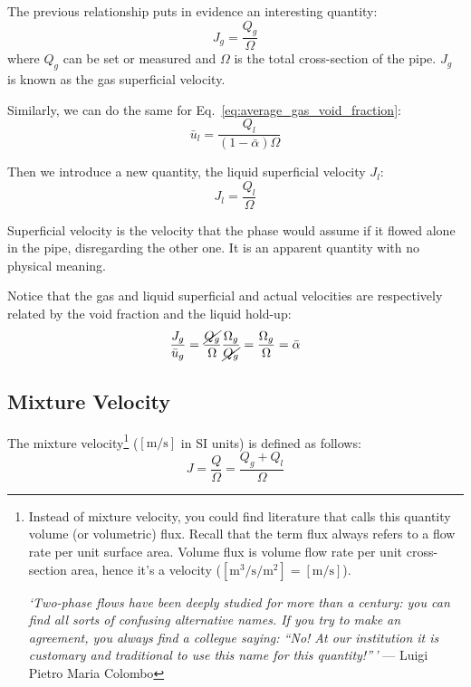 The previous relationship puts in evidence an interesting quantity:
\begin{equation*}
    J_g = \frac{Q_g}{\Omega}
\end{equation*}
where $Q_g$ can be set or measured and $\Omega$ is the total cross-section of
the pipe. $J_g$ is known as the gas superficial velocity.

Similarly, we can do the same for Eq.~\ref{eq:average_gas_void_fraction}:
\begin{equation*}
    \bar{u}_l = \frac{Q_l}{(1-\bar{\alpha}){\Omega}}
\end{equation*}

Then we introduce a new quantity, the liquid superficial velocity $J_l$:
\begin{equation*}
    J_l = \frac{Q_l}{\Omega}
\end{equation*}

Superficial velocity is the velocity that the phase would assume if it flowed
alone in the pipe, disregarding the other one. It is an apparent quantity with
no physical meaning.

Notice that the gas and liquid superficial and actual velocities are
respectively related by the void fraction and the liquid hold-up:
\begin{equation*}
    \frac{J_g}{\bar{u}_g} = \frac{\cancel{Q_g}}{\Omega} \frac{\Omega_g}{\cancel{Q_g}} = \frac{\Omega_g}{\Omega} = \bar{\alpha}
\end{equation*}

\subsection{Mixture Velocity}
The mixture velocity\footnote{Instead of mixture velocity, you could find
literature that calls this quantity volume (or volumetric) flux. Recall that the
term flux always refers to a flow rate per unit surface area. Volume flux is
volume flow rate per unit cross-section area, hence it's a velocity
($[\si{\cubic\meter\per\second}\si{\per\square\meter}] =
[\si{\metre\per\second}]$).

\textit{`Two-phase flows have been deeply studied for more than a century: you
can find all sorts of confusing alternative names. If you try to make an
agreement, you always find a collegue saying: ``No! At our institution it is
customary and traditional to use this name for this quantity!''\,'} --- Luigi
Pietro Maria Colombo} ($[\si{\metre\per\second}]$ in SI units) is defined as
follows:
\begin{equation*}
    J = \frac{Q}{\Omega} = \frac{Q_g+Q_l}{\Omega}
\end{equation*}

